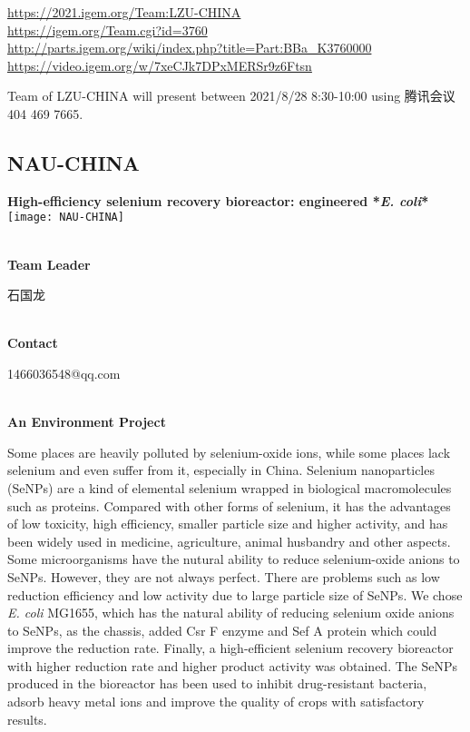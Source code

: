 \url{https://2021.igem.org/Team:LZU-CHINA }\\
\url{https://igem.org/Team.cgi?id=3760 }\\
\url{http://parts.igem.org/wiki/index.php?title=Part:BBa_K3760000 }\\
\url{https://video.igem.org/w/7xeCJk7DPxMERSr9z6Ftsn }\\

\vfill{}









Team of LZU-CHINA will present between    2021/8/28 8:30-10:00     using 腾讯会议 404 469 7665.
\newpage


\subsection{\textcolor{Blu}{ NAU-CHINA } }
\vspace{5mm}
\begin{center}
\large{
  \textbf{ High-efficiency selenium recovery bioreactor: engineered *\textit{E. coli}* }\\

  \texttt{[image: NAU-CHINA]}
}
\end{center}
\textbf{\\Team Leader}

  石国龙


\textbf{\\Contact}

  1466036548@qq.com

\textbf{\\An Environment Project\\}\begin{spacing}{1.5}

Some places are heavily polluted by selenium-oxide ions, while some places lack selenium and even suffer from it, especially in China. Selenium nanoparticles (SeNPs) are a kind of elemental selenium wrapped in biological macromolecules such as proteins. Compared with other forms of selenium, it has the advantages of low toxicity, high efficiency, smaller particle size and higher activity, and has been widely used in medicine, agriculture, animal husbandry and other aspects. Some microorganisms have the nutural ability to reduce selenium-oxide anions to SeNPs. However, they are not always perfect. There are problems such as low reduction efficiency and low activity due to large particle size of SeNPs. We chose \textit{E. coli} MG1655, which has the natural ability of reducing selenium oxide anions to SeNPs, as the chassis, added Csr F enzyme and Sef  A protein which could improve the reduction rate. Finally, a high-efficient selenium recovery bioreactor with higher reduction rate and higher product activity was obtained. The SeNPs produced in the bioreactor has been used to inhibit drug-resistant bacteria, adsorb heavy metal ions and improve the quality of crops with satisfactory results.\end{spacing}
\\

